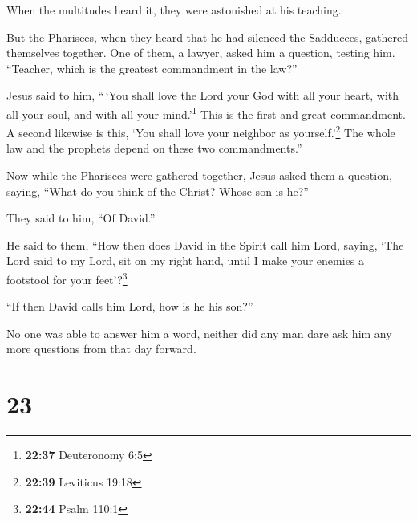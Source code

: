  When the multitudes heard it, they were astonished at
his teaching.

 But the Pharisees, when they heard that he had silenced
the Sadducees, gathered themselves together.  One of
them, a lawyer, asked him a question, testing him. 
``Teacher, which is the greatest commandment in the law?''

 Jesus said to him, ``\,`You shall love the Lord your God
with all your heart, with all your soul, and with all your
mind.'\footnote{\textbf{22:37} Deuteronomy 6:5}  This is
the first and great commandment.  A second likewise is
this, `You shall love your neighbor as yourself.'\footnote{\textbf{22:39}
  Leviticus 19:18}  The whole law and the prophets depend
on these two commandments.''

 Now while the Pharisees were gathered together, Jesus
asked them a question,  saying, ``What do you think of
the Christ? Whose son is he?''

They said to him, ``Of David.''

 He said to them, ``How then does David in the Spirit
call him Lord, saying,  `The Lord said to my Lord, sit on
my right hand, until I make your enemies a footstool for your
feet'?\footnote{\textbf{22:44} Psalm 110:1}

 ``If then David calls him Lord, how is he his son?''

 No one was able to answer him a word, neither did any
man dare ask him any more questions from that day forward.

\hypertarget{section-22}{%
\section{23}\label{section-22}}

